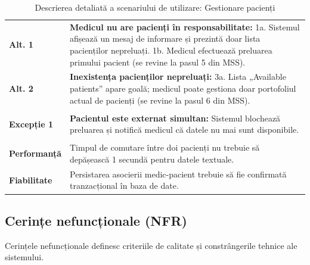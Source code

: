 \begin{table}[htbp]
\begin{tabularx}{\textwidth}{|l|X|}
\rowcolor[HTML]{EFEFEF} 
\multicolumn{2}{|l|}{\textbf{Scenarii alternative}} \\ \hline
\textbf{Alt. 1} & \textbf{Medicul nu are pacienți în responsabilitate:} \newline
1a. Sistemul afișează un mesaj de informare și prezintă doar lista pacienților nepreluați. \newline
1b. Medicul efectuează preluarea primului pacient (se revine la pasul 5 din MSS). \\ \hline
\textbf{Alt. 2} & \textbf{Inexistența pacienților nepreluați:} \newline
3a. Lista „Available patients” apare goală; medicul poate gestiona doar portofoliul actual de pacienți (se revine la pasul 6 din MSS). \\ \hline

\rowcolor[HTML]{EFEFEF} 
\multicolumn{2}{|l|}{\textbf{Excepții}} \\ \hline
\textbf{Excepție 1} & \textbf{Pacientul este externat simultan:} Sistemul blochează preluarea și notifică medicul că datele nu mai sunt disponibile. \\ \hline

\rowcolor[HTML]{EFEFEF} 
\multicolumn{2}{|l|}{\textbf{Cerințe de calitate}} \\ \hline
\textbf{Performanță} & Timpul de comutare între doi pacienți nu trebuie să depășească 1 secundă pentru datele textuale. \\ \hline
\textbf{Fiabilitate} & Persistarea asocierii medic-pacient trebuie să fie confirmată tranzacțional în baza de date. \\ \hline
\end{tabularx}
\caption{Descrierea detaliată a scenariului de utilizare: Gestionare pacienți}
\label{tab:detaliu_gestiune}
\end{table}

\subsection*{Cerințe nefuncționale (NFR)}

Cerințele nefuncționale definesc criteriile de calitate și constrângerile tehnice ale sistemului.

